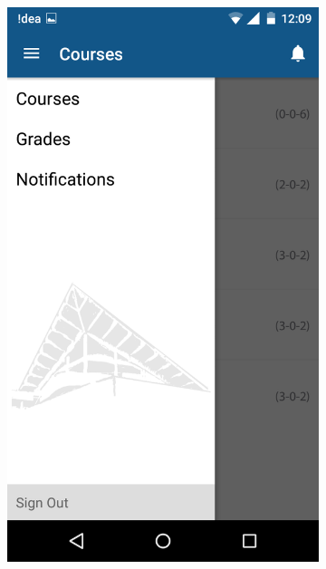\documentclass{article}
\begin{document}
\begin{itemize}
\begin{figure}[!h]
\begin{subfigure}{.4\textwidth}
	\includegraphics[width=0.8\linewidth]{pic3}
    \caption*{}
\end{subfigure}
\begin{subfigure}{.4\textwidth}
  \centering

\end{subfigure}
\end{figure}
\end{itemize}
\end{document}
